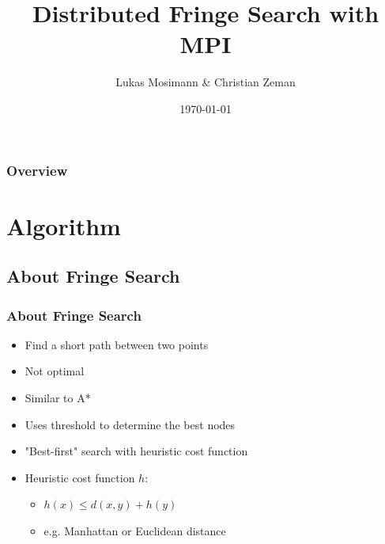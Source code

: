 \documentclass{beamer}
\title[Distributed Fringe Search]{Distributed Fringe Search with MPI} %
\author{Lukas Mosimann \& Christian Zeman} %
\institute[ETH] %
{
ETH Zürich \\ %
\medskip
\textit{Design of Parallel and High-Performance Computing} %
}
\date{\today} %
\begin{document}
\begin{frame}
\titlepage %
\end{frame}

\begin{frame}
\frametitle{Overview} %
\tableofcontents %
\end{frame}


\section{Algorithm} %

\subsection{About Fringe Search} %

\begin{frame}
\frametitle{About Fringe Search}
\begin{itemize}
\item Find a short path between two points
\item Not optimal
\item Similar to A*
\item Uses threshold to determine the best nodes
\item "Best-first" search with heuristic cost function
\item Heuristic cost function $h$:
	\begin{itemize}
	\item $h(x) \le d(x,y) + h(y)$
	\item e.g. Manhattan or Euclidean distance
	\end{itemize}
\end{itemize}
\end{frame}
\end{document}
